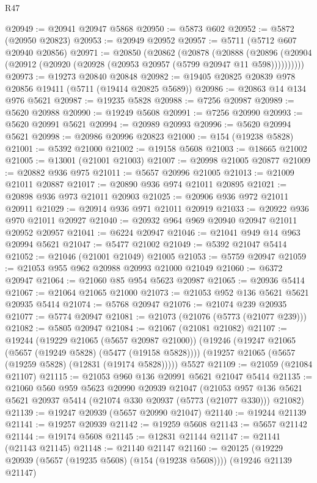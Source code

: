 \begin{lexlean}{R47}
\begin{coremodule}
@20949 := @20941 @20947 @5868
@20950 := @5873 @602
@20952 := @5872 (@20950 @20823)
@20953 := @20949 @20952
@20957 := @5711 (@5712 @607 @20940 @20856)
@20971 := @20850
    (@20862
      (@20878
        (@20888
          (@20896 (@20904 (@20912 (@20920 (@20928 (@20953 @20957 (@5799 @20947 @11 @598))))))))))
@20973 := @19273 @20840 @20848
@20982 := @19405 @20825 @20839 @978 @20856 @19411 (@5711 (@19414 @20825 @5689))
@20986 := @20863 @14 @134 @976 @5621
@20987 := @19235 @5828
@20988 := @7256 @20987
@20989 := @5620 @20988
@20990 := @19249 @5608
@20991 := @7256 @20990
@20993 := @5620 @20991 @5621
@20994 := @20989 @20993
@20996 := @5620 @20994 @5621
@20998 := @20986 @20996 @20823
@21000 := @154 (@19238 @5828)
@21001 := @5392 @21000
@21002 := @19158 @5608
@21003 := @18665 @21002
@21005 := @13001 (@21001 @21003)
@21007 := @20998 @21005 @20877
@21009 := @20882 @936 @975
@21011 := @5657 @20996 @21005
@21013 := @21009 @21011 @20887
@21017 := @20890 @936 @974 @21011 @20895
@21021 := @20898 @936 @973 @21011 @20903
@21025 := @20906 @936 @972 @21011 @20911
@21029 := @20914 @936 @971 @21011 @20919
@21033 := @20922 @936 @970 @21011 @20927
@21040 := @20932 @964 @969 @20940 @20947 @21011 @20952 @20957
@21041 := @6224 @20947
@21046 := @21041 @949 @14 @963 @20994 @5621
@21047 := @5477 @21002
@21049 := @5392 @21047 @5414
@21052 := @21046 (@21001 @21049) @21005
@21053 := @5759 @20947
@21059 := @21053 @955 @962 @20988 @20993 @21000 @21049
@21060 := @6372 @20947
@21064 := @21060 @85 @954 @5623 @20987
@21065 := @20936 @5414
@21067 := @21064 @21065 @21000
@21073 := @21053 @952 @136 @5621 @5621 @20935 @5414
@21074 := @5768 @20947
@21076 := @21074 @239 @20935
@21077 := @5774 @20947
@21081 := @21073 (@21076 (@5773 (@21077 @239)))
@21082 := @5805 @20947
@21084 := @21067 (@21081 @21082)
@21107 := @19244
    (@19229 @21065 (@5657 @20987 @21000))
    (@19246
      (@19247 @21065 (@5657 (@19249 @5828) (@5477 (@19158 @5828))))
      (@19257 @21065 (@5657 (@19259 @5828) (@12831 (@19174 @5828)))))
    @5527
@21109 := @21059 (@21084 @21107)
@21115 := @21053 @960 @136 @20991 @5621 @21047 @5414
@21135 := @21060
    @560
    @959
    @5623
    @20990
    @20939
    @21047
    (@21053 @957 @136 @5621 @5621 @20937 @5414 (@21074 @330 @20937 (@5773 (@21077 @330))) @21082)
@21139 := @19247 @20939 (@5657 @20990 @21047)
@21140 := @19244 @21139
@21141 := @19257 @20939
@21142 := @19259 @5608
@21143 := @5657 @21142
@21144 := @19174 @5608
@21145 := @12831 @21144
@21147 := @21141 (@21143 @21145)
@21148 := @21140 @21147
@21160 := @20125
    (@19229 @20939 (@5657 (@19235 @5608) (@154 (@19238 @5608))))
    (@19246 @21139 @21147)

\end{coremodule}
\end{lexlean}
